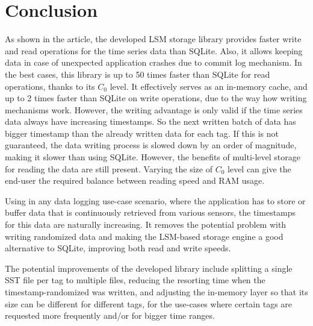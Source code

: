 \section{Conclusion}

As shown in the article, the developed LSM storage library provides faster write and read operations for the time series data than SQLite. Also, it allows keeping data in case of unexpected application crashes due to commit log mechanism. In the best cases, this library is up to 50 times faster than SQLite for read operations, thanks to its $C_0$ level. It effectively serves as an in-memory cache, and up to 2 times faster than SQLite on write operations, due to the way how writing mechanisms work. However, the writing advantage is only valid if the time series data always have increasing timestamps. So the next written batch of data has bigger timestamp than the already written data for each tag. If this is not guaranteed, the data writing process is slowed down by an order of magnitude, making it slower than using SQLite. However, the benefits of multi-level storage for reading the data are still present. Varying the size of $C_0$ level can give the end-user the required balance between reading speed and RAM usage.

Using in any data logging use-case scenario, where the application has to store or buffer data that is continuously retrieved from various sensors, the timestamps for this data are naturally increasing. It removes the potential problem with writing randomized data and making the LSM-based storage engine a good alternative to SQLite, improving both read and write speeds.

The potential improvements of the developed library include splitting a single SST file per tag to multiple files, reducing the resorting time when the timestamp-randomized was written, and adjusting the in-memory layer so that its size can be different for different tags, for the use-cases where certain tags are requested more frequently and/or for bigger time ranges.